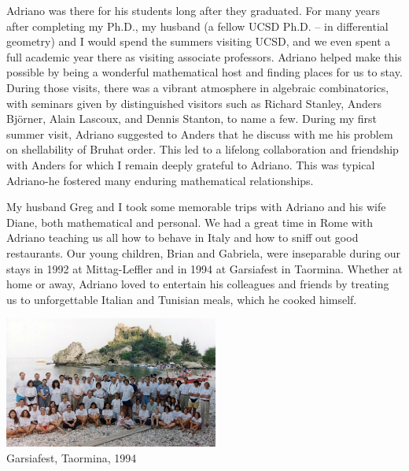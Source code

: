 \documentclass{notices}
\begin{document}
Adriano was there for his students long after they graduated.    For many years after completing my Ph.D., my husband (a fellow UCSD Ph.D. -- in differential geometry)  and I would
spend the summers visiting UCSD, and we even spent a full academic year there as visiting associate professors.   
Adriano helped make this possible by being a wonderful mathematical host and finding  places for us to stay.   
During those visits, there was a vibrant atmosphere in algebraic combinatorics, with seminars given
by distinguished visitors such as Richard Stanley, Anders Bj\"orner, Alain Lascoux, and Dennis Stanton, to name a few.
During my first summer visit, Adriano suggested to Anders that he discuss with me his problem  on shellability of Bruhat order.   This led to a lifelong collaboration and friendship with Anders for which I remain deeply grateful to Adriano. This was typical Adriano-he fostered many enduring mathematical relationships.

My husband Greg and I took some memorable trips with Adriano and his wife Diane, both mathematical and personal.  We had a great time in Rome with Adriano teaching us all how to behave in Italy and how to sniff out good restaurants. Our young children, Brian and Gabriela, were inseparable during our stays in 1992 at Mittag-Leffler and in 1994 at Garsiafest in Taormina. Whether at home or away,  Adriano loved to entertain his colleagues and friends by treating us to unforgettable Italian and Tunisian meals, which he cooked himself.

\begin{center}
 \includegraphics[height=1.7in]{Michelle_Wachs/EmbeddedImage.jpeg} 
 \\ {\footnotesize Garsiafest, Taormina, 1994}
\end{center}
\end{document}
